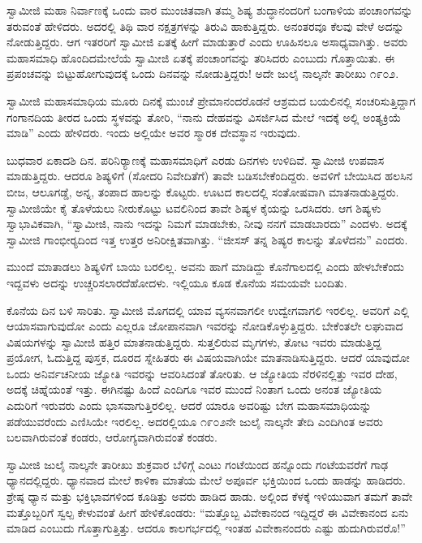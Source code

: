  ಸ್ವಾಮೀಜಿ ಮಹಾ ನಿರ್ವಾಣಕ್ಕೆ ಒಂದು ವಾರ ಮುಂಚಿತವಾಗಿ ತಮ್ಮ ಶಿಷ್ಯ ಶುದ್ಧಾನಂದರಿಗೆ ಬಂಗಾಳಿಯ ಪಂಚಾಂಗವನ್ನು ತರುವಂತೆ ಹೇಳಿದರು. ಅದರಲ್ಲಿ ತಿಥಿ ವಾರ ನಕ್ಷತ್ರಗಳನ್ನು ತಿರುವಿ ಹಾಕುತ್ತಿದ್ದರು. ಅನಂತರವೂ ಕೆಲವು ವೇಳೆ ಅದನ್ನು ನೋಡುತ್ತಿದ್ದರು. ಆಗ ಇತರರಿಗೆ ಸ್ವಾಮೀಜಿ ಏತಕ್ಕೆ ಹೀಗೆ ಮಾಡುತ್ತಾರೆ ಎಂದು ಊಹಿಸಲೂ ಅಸಾಧ್ಯವಾಗಿತ್ತು. ಅವರು ಮಹಾಸಮಾಧಿ ಹೊಂದಿದಮೇಲೆಯೆ ಸ್ವಾಮೀಜಿ ಏತಕ್ಕೆ ಪಂಚಾಂಗವನ್ನು ತರಿಸಿದರು ಎಂಬುದು ಗೊತ್ತಾಯಿತು. ಈ ಪ್ರಪಂಚವನ್ನು ಬಿಟ್ಟುಹೋಗುವುದಕ್ಕೆ ಒಂದು ದಿನವನ್ನು ನೋಡುತ್ತಿದ್ದರು! ಅದೇ ಜುಲೈ ನಾಲ್ಕನೇ ತಾರೀಖು ೧೯೦೨. 

 ಸ್ವಾಮೀಜಿ ಮಹಾಸಮಾಧಿಯ ಮೂರು ದಿನಕ್ಕೆ ಮುಂಚೆ ಪ್ರೇಮಾನಂದರೊಡನೆ ಆಶ್ರಮದ ಬಯಲಿನಲ್ಲಿ ಸಂಚರಿಸುತ್ತಿದ್ದಾಗ ಗಂಗಾನದಿಯ ತೀರದ ಒಂದು ಸ್ಥಳವನ್ನು ತೋರಿ, “ನಾನು ದೇಹವನ್ನು ವಿಸರ್ಜಿಸಿದ ಮೇಲೆ ಇದಕ್ಕೆ ಅಲ್ಲಿ ಅಂತ್ಯಕ್ರಿಯೆ ಮಾಡಿ” ಎಂದು ಹೇಳಿದರು. ಇಂದು ಅಲ್ಲಿಯೇ ಅವರ ಸ್ಮಾರಕ ದೇವಸ್ಥಾನ ಇರುವುದು. 

 ಬುಧವಾರ ಏಕಾದಶಿ ದಿನ. ಪರಿನಿರ‍್ಯಾಣಕ್ಕೆ ಮಹಾಸಮಾಧಿಗೆ ಎರಡು ದಿನಗಳು ಉಳಿದಿವೆ. ಸ್ವಾಮೀಜಿ ಉಪವಾಸ ಮಾಡುತ್ತಿದ್ದರು. ಆದರೂ ಶಿಷ್ಯಳಿಗೆ (ಸೋದರಿ ನಿವೇದಿತೆಗೆ) ತಾವೇ ಬಡಿಸಬೇಕೆಂದಿದ್ದರು. ಅವಳಿಗೆ ಬೇಯಿಸಿದ ಹಲಸಿನ ಬೀಜ, ಆಲೂಗಡ್ಡೆ, ಅನ್ನ, ತಂಪಾದ ಹಾಲನ್ನು ಕೊಟ್ಟರು. ಊಟದ ಕಾಲದಲ್ಲಿ ಸಂತೋಷವಾಗಿ ಮಾತನಾಡುತ್ತಿದ್ದರು. ಸ್ವಾಮೀಜಿಯೇ ಕೈ ತೊಳೆಯಲು ನೀರುಕೊಟ್ಟು ಟವಲಿನಿಂದ ತಾವೇ ಶಿಷ್ಯಳ ಕೈಯನ್ನು ಒರಸಿದರು. ಆಗ ಶಿಷ್ಯಳು ಸ್ವಾಭಾವಿಕವಾಗಿ, “ಸ್ವಾಮೀಜಿ, ನಾನು ಇದನ್ನು ನಿಮಗೆ ಮಾಡಬೇಕು, ನೀವು ನನಗೆ ಮಾಡಬಾರದು” ಎಂದಳು. ಅದಕ್ಕೆ ಸ್ವಾಮೀಜಿ ಗಾಂಭೀರ‍್ಯದಿಂದ ಇತ್ತ ಉತ್ತರ ಅನಿರೀಕ್ಷಿತವಾಗಿತ್ತು. “ಜೀಸಸ್ ತನ್ನ ಶಿಷ್ಯರ ಕಾಲನ್ನು ತೊಳೆದನು” ಎಂದರು. 

 ಮುಂದೆ ಮಾತಾಡಲು ಶಿಷ್ಯಳಿಗೆ ಬಾಯಿ ಬರಲಿಲ್ಲ. ಅವನು ಹಾಗೆ ಮಾಡಿದ್ದು ಕೊನೆಗಾಲದಲ್ಲಿ ಎಂದು ಹೇಳಬೇಕೆಂದು ಇದ್ದವಳು ಅದನ್ನು ಉಚ್ಚರಿಸಲಾರದೆ\break ಹೋದಳು. ಇಲ್ಲಿಯೂ ಕೂಡ ಕೊನೆಯ ಸಮಯವೇ ಬಂದಿತು. 

 ಕೊನೆಯ ದಿನ ಬಳಿ ಸಾರಿತು. ಸ್ವಾಮೀಜಿ ಮೊಗದಲ್ಲಿ ಯಾವ ವ್ಯಸನವಾಗಲೀ ಉದ್ವೇಗವಾಗಲಿ ಇರಲಿಲ್ಲ. ಅವರಿಗೆ ಎಲ್ಲಿ ಆಯಾಸವಾಗುವುದೋ ಎಂದು ಎಲ್ಲರೂ ಜೋಪಾನವಾಗಿ ಇವರನ್ನು ನೋಡಿಕೊಳ್ಳುತ್ತಿದ್ದರು. ಬೇಕೆಂತಲೇ ಲಘುವಾದ ವಿಷಯಗಳನ್ನು ಸ್ವಾಮೀಜಿ ಹತ್ತಿರ ಮಾತನಾಡುತ್ತಿದ್ದರು. ಸುತ್ತಲಿರುವ ಮೃಗಗಳು, ತೋಟ ಇವರು ಮಾಡುತ್ತಿದ್ದ ಪ್ರಯೋಗ, ಓದುತ್ತಿದ್ದ ಪುಸ್ತಕ, ದೂರದ ಸ್ನೇಹಿತರು ಈ ವಿಷಯವಾಗಿಯೇ ಮಾತನಾಡಿಸುತ್ತಿದ್ದರು. ಆದರೆ ಯಾವುದೋ ಒಂದು ಅನಿರ್ವಚನೀಯ ಜ್ಯೋತಿ ಇವರನ್ನು ಆವರಿಸಿದಂತೆ ತೋರಿತು. ಆ ಜ್ಯೋತಿಯ ನೆರಳಿನಲ್ಲಿತ್ತು ಇವರ ದೇಹ, ಅದಕ್ಕೆ ಚಿಹ್ನೆಯಂತೆ ಇತ್ತು. ಈಗಿನಷ್ಟು ಹಿಂದೆ ಎಂದಿಗೂ ಇವರ ಮುಂದೆ ನಿಂತಾಗ ಒಂದು ಅನಂತ ಜ್ಯೋತಿಯ ಎದುರಿಗೆ ಇರುವರು ಎಂದು ಭಾಸವಾಗುತ್ತಿರಲಿಲ್ಲ. ಆದರೆ ಯಾರೂ ಅವರಿಷ್ಟು ಬೇಗ ಮಹಾಸಮಾಧಿಯನ್ನು ಪಡೆಯುವರೆಂದು ಎಣಿಸಿಯೇ ಇರಲಿಲ್ಲ. ಅದರಲ್ಲಿಯೂ ೧೯೦೨ನೇ ಜುಲೈ ನಾಲ್ಕನೇ ತೇದಿ ಎಂದಿಗಿಂತ ಅವರು ಬಲವಾಗಿರುವಂತೆ ಕಂಡರು, ಆರೋಗ್ಯವಾಗಿರುವಂತೆ ಕಂಡರು. 

 ಸ್ವಾಮೀಜಿ ಜುಲೈ ನಾಲ್ಕನೇ ತಾರೀಖು ಶುಕ್ರವಾರ ಬೆಳಿಗ್ಗೆ ಎಂಟು ಗಂಟೆಯಿಂದ ಹನ್ನೊಂದು ಗಂಟೆಯವರೆಗೆ ಗಾಢ ಧ್ಯಾನದಲ್ಲಿದ್ದರು. ಧ್ಯಾನವಾದ ಮೇಲೆ ಕಾಳಿಕಾ ಮಾತೆಯ ಮೇಲೆ ಅಪೂರ್ವ ಭಕ್ತಿಯಿಂದ ಒಂದು ಹಾಡನ್ನು ಹಾಡಿದರು. ಶ್ರೇಷ್ಠ ಧ್ಯಾನ ಮತ್ತು ಭಕ್ತಿಭಾವಗಳಿಂದ ಕೂಡಿತ್ತು ಅವರು ಹಾಡಿದ ಹಾಡು. ಅಲ್ಲಿಂದ ಕೆಳಕ್ಕೆ ಇಳಿಯುವಾಗ ತಮಗೆ ತಾವೇ ಮತ್ತೊಬ್ಬರಿಗೆ ಸ್ವಲ್ಪ ಕೇಳುವಂತೆ ಹೀಗೆ ಹೇಳಿಕೊಂಡರು: “ಮತ್ತೊಬ್ಬ ವಿವೇಕಾನಂದ ಇದ್ದಿದ್ದರೆ ಈ ವಿವೇಕಾನಂದ ಏನು ಮಾಡಿದ ಎಂಬುದು ಗೊತ್ತಾಗುತ್ತಿತ್ತು. ಆದರೂ ಕಾಲಗರ್ಭದಲ್ಲಿ ಇಂತಹ ವಿವೇಕಾನಂದರು ಎಷ್ಟು ಹುದುಗಿರುವರೊ!” 

